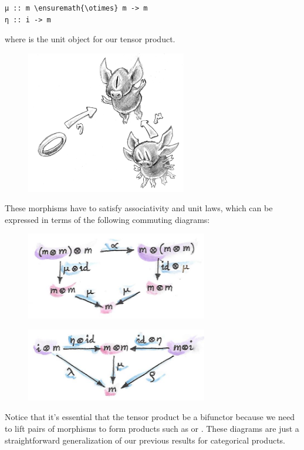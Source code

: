 \begin{Verbatim}[commandchars=\\\{\}]
μ :: m \ensuremath{\otimes} m -> m
η :: i -> m
\end{Verbatim}
where  is the unit object for our tensor product.

\begin{figure}[H]
\centering
\includegraphics[width=70mm]{images/monoid-1.jpg}
\end{figure}

\noindent
These morphisms have to satisfy associativity and unit laws, which can
be expressed in terms of the following commuting diagrams:

\begin{figure}[H]
\centering
\includegraphics[width=3.12500in]{images/assoctensor.jpg}
\end{figure}

\begin{figure}[H]
\centering
\includegraphics[width=3.12500in]{images/unitmon.jpg}
\end{figure}

\noindent
Notice that it's essential that the tensor product be a bifunctor
because we need to lift pairs of morphisms to form products such as
 or . These diagrams are just a
straightforward generalization of our previous results for categorical
products.

